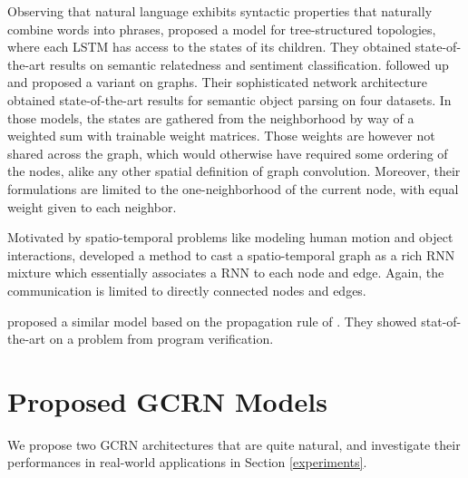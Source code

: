 \documentclass{article} %
\begin{document}
Observing that natural language exhibits syntactic properties that naturally
combine words into phrases, \citet{treelstm} proposed a model for
tree-structured topologies, where each LSTM has access to the states of its
children. They obtained state-of-the-art results on semantic relatedness and
sentiment classification. \citet{graphlstm} followed up and proposed a variant
on graphs. Their sophisticated network architecture obtained state-of-the-art
results for semantic object parsing on four datasets. In those models, the
states are gathered from the neighborhood by way of a weighted sum with
trainable weight matrices. Those weights are however not shared across the
graph, which would otherwise have required some ordering of the nodes, alike
any other spatial definition of graph convolution. Moreover, their formulations
are limited to the one-neighborhood of the current node, with equal weight
given to each neighbor.

Motivated by spatio-temporal problems like modeling human motion and object
interactions, \citet{structuralrnn} developed a method to cast a
spatio-temporal graph as a rich RNN mixture which essentially associates a RNN
to each node and edge. Again, the communication is limited to directly
connected nodes and edges.


\citet{ggsnn_li} proposed a similar model based on the propagation rule of
\citet{gnn_scarcelli}. They showed stat-of-the-art on a problem from program
verification.

\section{Proposed GCRN Models}
\label{sec:our_models}


We propose two GCRN architectures that are quite natural, and investigate their performances in real-world applications in Section \ref{experiments}.
\end{document}
